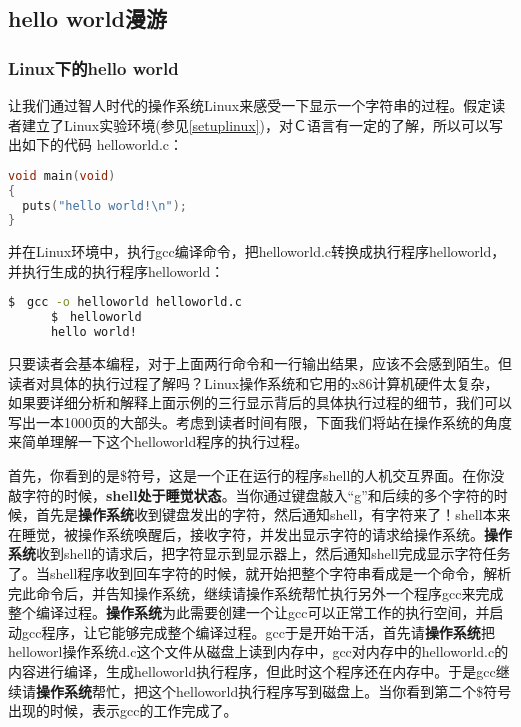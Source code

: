 \subsection{hello world漫游}

\subsubsection{Linux下的hello world}
让我们通过智人时代的操作系统Linux来感受一下显示一个字符串的过程。假定读者建立了Linux实验环境(参见\ref{setuplinux})，对Ｃ语言有一定的了解，所以可以写出如下的代码 helloworld.c：
\begin{lstlisting}[language={C}]
void main(void)
{
  puts("hello world!\n");
}
\end{lstlisting}

并在Linux环境中，执行gcc编译命令，把helloworld.c转换成执行程序helloworld，并执行生成的执行程序helloworld：



\begin{lstlisting}[language={bash}]
	  $　gcc -o helloworld helloworld.c
	  $　helloworld
	  hello world!
\end{lstlisting}

只要读者会基本编程，对于上面两行命令和一行输出结果，应该不会感到陌生。但读者对具体的执行过程了解吗？Linux操作系统和它用的x86计算机硬件太复杂，如果要详细分析和解释上面示例的三行显示背后的具体执行过程的细节，我们可以写出一本1000页的大部头。考虑到读者时间有限，下面我们将站在操作系统的角度来简单理解一下这个helloworld程序的执行过程。

首先，你看到的是\$符号，这是一个正在运行的程序shell的人机交互界面。在你没敲字符的时候，\textbf{shell处于睡觉状态}。当你通过键盘敲入“g”和后续的多个字符的时候，首先是\textbf{操作系统}收到键盘发出的字符，然后通知shell，有字符来了！shell本来在睡觉，被操作系统唤醒后，接收字符，并发出显示字符的请求给操作系统。\textbf{操作系统}收到shell的请求后，把字符显示到显示器上，然后通知shell完成显示字符任务了。当shell程序收到回车字符的时候，就开始把整个字符串看成是一个命令，解析完此命令后，并告知操作系统，继续请操作系统帮忙执行另外一个程序gcc来完成整个编译过程。\textbf{操作系统}为此需要创建一个让gcc可以正常工作的执行空间，并启动gcc程序，让它能够完成整个编译过程。gcc于是开始干活，首先请\textbf{操作系统}把helloworl操作系统d.c这个文件从磁盘上读到内存中，gcc对内存中的helloworld.c的内容进行编译，生成helloworld执行程序，但此时这个程序还在内存中。于是gcc继续请\textbf{操作系统}帮忙，把这个helloworld执行程序写到磁盘上。当你看到第二个\$符号出现的时候，表示gcc的工作完成了。

